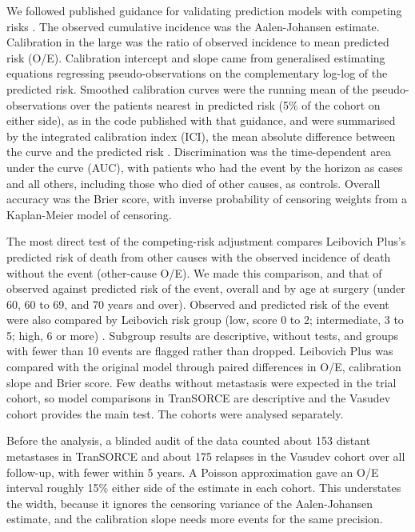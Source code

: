 \documentclass[11pt,a4paper]{article}
\begin{document}
We followed published guidance for validating prediction models with competing risks \cite{van_Geloven_2022}.
The observed cumulative incidence was the Aalen-Johansen estimate.
Calibration in the large was the ratio of observed incidence to mean predicted risk (O/E).
Calibration intercept and slope came from generalised estimating equations regressing pseudo-observations on the complementary log-log of the predicted risk.
Smoothed calibration curves were the running mean of the pseudo-observations over the patients nearest in predicted risk (5\% of the cohort on either side), as in the code published with that guidance, and were summarised by the integrated calibration index (ICI), the mean absolute difference between the curve and the predicted risk \cite{van_Geloven_2022}.
Discrimination was the time-dependent area under the curve (AUC), with patients who had the event by the horizon as cases and all others, including those who died of other causes, as controls.
Overall accuracy was the Brier score, with inverse probability of censoring weights from a Kaplan-Meier model of censoring.

The most direct test of the competing-risk adjustment compares Leibovich Plus's predicted risk of death from other causes with the observed incidence of death without the event (other-cause O/E).
We made this comparison, and that of observed against predicted risk of the event, overall and by age at surgery (under 60, 60 to 69, and 70 years and over).
Observed and predicted risk of the event were also compared by Leibovich risk group (low, score 0 to 2; intermediate, 3 to 5; high, 6 or more) \cite{Leibovich_2003}.
Subgroup results are descriptive, without tests, and groups with fewer than 10 events are flagged rather than dropped.
Leibovich Plus was compared with the original model through paired differences in O/E, calibration slope and Brier score.
Few deaths without metastasis were expected in the trial cohort, so model comparisons in TranSORCE are descriptive and the Vasudev cohort provides the main test.
The cohorts were analysed separately.

Before the analysis, a blinded audit of the data counted about 153 distant metastases in TranSORCE and about 175 relapses in the Vasudev cohort over all follow-up, with fewer within 5 years.
A Poisson approximation gave an O/E interval roughly 15\% either side of the estimate in each cohort.
This understates the width, because it ignores the censoring variance of the Aalen-Johansen estimate, and the calibration slope needs more events for the same precision.
\end{document}
